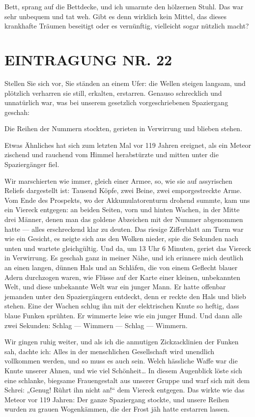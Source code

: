 Bett, sprang auf die Bettdecke, und ich umarmte den hölzernen
Stuhl. Das war sehr unbequem und tat weh. Gibt es denn wirklich
kein Mittel, das dieses krankhafte Träumen beseitigt oder es
vernünftig, vielleicht sogar nützlich macht?

\section{EINTRAGUNG NR. 22}

Stellen Sie sich vor, Sie ständen an einem Ufer: die Wellen steigen
langsam, und plötzlich verharren sie still, erkalten, erstarren.
Genauso schrecklich und unnatürlich war, was bei unserem gesetzlich
vorgeschriebenen Spaziergang geschah:

Die Reihen der Nummern stockten, gerieten in Verwirrung und blieben
stehen.

Etwas Ähnliches hat sich zum letzten Mal vor 119 Jahren ereignet,
als ein Meteor zischend und rauchend vom Himmel herabstürzte und
mitten unter die Spaziergänger fiel.

Wir marschierten wie immer, gleich einer Armee, so, wie sie auf
assyrischen Reliefs dargestellt ist: Tausend Köpfe, zwei Beine,
zwei emporgestreckte Arme. Vom Ende des Prospekts, wo der
Akkumulatorenturm drohend summte, kam uns ein Viereck entgegen: an
beiden Seiten, vorn und hinten Wachen, in der Mitte drei Männer,
denen man das goldene Abzeichen mit der Nummer abgenommen hatte —
alles erschreckend klar zu deuten. Das riesige Zifferblatt am Turm
war wie ein Gesicht, es neigte sich aus den Wolken nieder, spie die
Sekunden nach unten und wartete gleichgültig. Und da, um 13 Uhr 6
Minuten, geriet das Viereck in Verwirrung. Es geschah ganz in
meiner Nähe, und ich erinnere mich deutlich an einen langen, dünnen
Hals und an Schläfen, die von einem Geflecht blauer Adern
durchzogen waren, wie Flüsse auf der Karte einer kleinen,
unbekannten Welt, und diese unbekannte Welt war ein junger Mann. Er
hatte offenbar jemanden unter den Spaziergängern entdeckt, denn er
reckte den Hals und blieb stehen. Eine der Wachen schlug ihn mit
der elektrischen Knute so heftig, dass blaue Funken sprühten. Er
wimmerte leise wie ein junger Hund. Und dann alle zwei Sekunden:
Schlag — Wimmern — Schlag — Wimmern.

Wir gingen ruhig weiter, und als ich die anmutigen Zickzacklinien
der Funken sah, dachte ich: Alles in der menschlichen Gesellschaft
wird unendlich vollkommen werden, und so muss es auch sein. Welch
hässliche Waffe war die Knute unserer Ahnen, und wie viel
Schönheit\ldots{} In diesem Augenblick löste sich eine schlanke,
biegsame Frauengestalt aus unserer Gruppe und warf sich mit dem
Schrei: „Genug! Rührt ihn nicht an!“ dem Viereck entgegen. Das
wirkte wie das Meteor vor 119 Jahren: Der ganze Spaziergang
stockte, und unsere Reihen wurden zu grauen Wogenkämmen, die der
Frost jäh hatte erstarren lassen.

